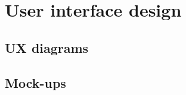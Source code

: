 \section{User interface design}
\label{sect:userinterfacedesign}

\subsection{UX diagrams}
\label{subsect:userexpirience}



\subsection{Mock-ups}
\label{subsect:mockups}